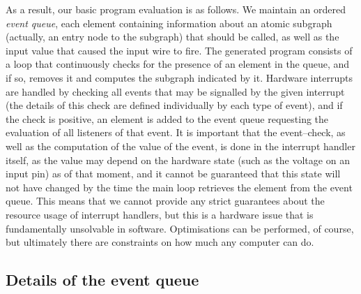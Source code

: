 \documentclass[a4paper, oneside, final]{memoir}
\begin{document}
As a result, our basic program evaluation is as follows.  We maintain
an ordered \textit{event queue}, each element containing information
about an atomic subgraph (actually, an entry node to the subgraph)
that should be called, as well as the input value that caused the
input wire to fire.  The generated program consists of a loop that
continuously checks for the presence of an element in the queue, and
if so, removes it and computes the subgraph indicated by it.  Hardware
interrupts are handled by checking all events that may be signalled by
the given interrupt (the details of this check are defined
individually by each type of event), and if the check is positive, an
element is added to the event queue requesting the evaluation of all
listeners of that event.  It is important that the event--check, as
well as the computation of the value of the event, is done in the
interrupt handler itself, as the value may depend on the hardware
state (such as the voltage on an input pin) as of that moment, and it
cannot be guaranteed that this state will not have changed by the time
the main loop retrieves the element from the event queue.  This means
that we cannot provide any strict guarantees about the resource usage
of interrupt handlers, but this is a hardware issue that is
fundamentally unsolvable in software.  Optimisations can be performed,
of course, but ultimately there are constraints on how much any
computer can do.

\subsection{Details of the event queue}
\end{document}
